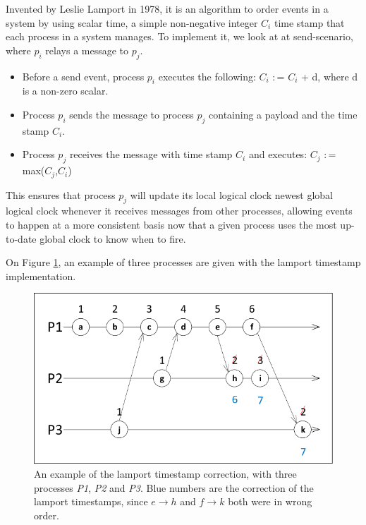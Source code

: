 Invented by Leslie Lamport in 1978, it is an algorithm to order events in a system by using scalar time, a simple non-negative integer $C_i$ time stamp that each process in a system manages. To implement it, we look at at send-scenario, where $p_i$ relays a message to $p_j$.

\begin{itemize}
	\item Before a send event, process $p_i$ executes the following: $C_i$ $\colon$=  $C_i$ + d, where d is a non-zero scalar.
	\item Process $p_i$ sends the message to process $p_j$ containing a payload and the time stamp $C_i$.
	\item Process $p_j$ receives the message with time stamp $C_i$ and executes: $C_j$ $\colon$= max($C_j$,$C_i$) 
\end{itemize}

This ensures that process $p_j$ will update its local logical clock newest global logical clock whenever it receives messages from other processes, allowing events to happen at a more consistent basis now that a given process uses the most up-to-date global clock to know when to fire.

On Figure \ref{fig:lamport}, an example of three processes are given with the lamport timestamp implementation.


\begin{figure}[H]
	\centering
	\includegraphics[width=0.3\linewidth]{synchronization/logicalClock/fig/lamport.pdf}
	\caption{An example of the lamport timestamp correction, with three processes \textit{P1}, \textit{P2} and \textit{P3}. Blue numbers are the correction of the lamport timestamps, since $e \rightarrow h$ and $f \rightarrow k$ both were in wrong order.}
	\label{fig:lamport}
\end{figure}
